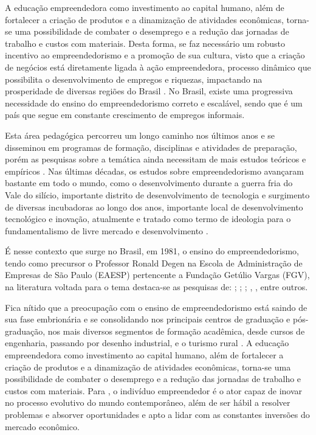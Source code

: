A educação empreendedora como investimento ao capital humano, além de fortalecer a criação de produtos e a dinamização de atividades econômicas, torna-se uma possibilidade de combater o desemprego e a redução das jornadas de trabalho e custos com materiais. Desta forma, se faz necessário um robusto incentivo ao empreendedorismo e a promoção de sua cultura, visto que a criação de negócios está diretamente ligada à ação empreendedora, processo dinâmico que possibilita o desenvolvimento de empregos e riquezas, impactando na prosperidade de diversas regiões do Brasil  \cite{leite_aprendizagem_2015}. No Brasil, existe uma progressiva necessidade do ensino do empreendedorismo correto e escalável, sendo que é um país que segue em constante crescimento de empregos informais.

Esta área pedagógica percorreu um longo caminho nos últimos anos e se disseminou em programas de formação, disciplinas e atividades de preparação, porém as pesquisas sobre a temática ainda necessitam de mais estudos teóricos e empíricos \cite{schaefer_educacao_2016-1}. Nas últimas décadas, os estudos sobre empreendedorismo avançaram bastante em todo o mundo, como o desenvolvimento durante a guerra fria do Vale do silício, importante distrito de desenvolvimento de tecnologia e surgimento de diversas incubadoras ao longo dos anos, importante local de desenvolvimento tecnológico e inovação, atualmente e tratado como termo de ideologia para o fundamentalismo de livre mercado e desenvolvimento \cite{schradie_ideologia_2017}.

É nesse contexto que surge no Brasil, em 1981, o ensino do empreendedorismo, tendo como precursor o Professor Ronald Degen \cite{degen_o_1989} na Escola de Administração de Empresas de São Paulo (EAESP) pertencente a Fundação Getúlio Vargas (FGV), na literatura voltada para o tema destaca-se as pesquisas de: ; ; ; , , entre outros. 


Fica nítido que a preocupação com o ensino de empreendedorismo está saindo de sua fase embrionária e se consolidando nos principais centros de graduação e pós-graduação, nos mais diversos segmentos de formação acadêmica, desde cursos de engenharia, passando por desenho industrial, e o turismo rural \cite{henrique_praticas_2008}. A educação empreendedora como investimento ao capital humano, além de fortalecer a criação de produtos e a dinamização de atividades econômicas, torna-se uma possibilidade de combater o desemprego \cite{morais_empreendedorismo_2018} e a redução das jornadas de trabalho e custos com materiais. Para , o indivíduo empreendedor é o ator capaz de inovar no processo evolutivo do mundo contemporâneo, além de ser hábil a resolver problemas e absorver oportunidades e apto a lidar com as constantes inversões do mercado econômico. 

